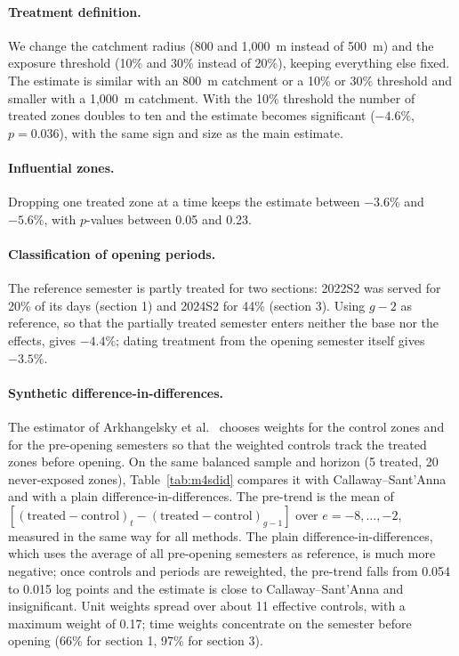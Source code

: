\paragraph{Treatment definition.} We change the catchment radius (800 and 1,000~m instead of 500~m) and the exposure threshold (10\% and 30\% instead of 20\%), keeping everything else fixed. The estimate is similar with an 800~m catchment or a 10\% or 30\% threshold and smaller with a 1,000~m catchment. With the 10\% threshold the number of treated zones doubles to ten and the estimate becomes significant ($-4.6\%$, $p=0.036$), with the same sign and size as the main estimate.

\paragraph{Influential zones.} Dropping one treated zone at a time keeps the estimate between $-3.6\%$ and $-5.6\%$, with $p$-values between 0.05 and 0.23.

\paragraph{Classification of opening periods.} The reference semester is partly treated for two sections: 2022S2 was served for 20\% of its days (section 1) and 2024S2 for 44\% (section 3). Using $g-2$ as reference, so that the partially treated semester enters neither the base nor the effects, gives $-4.4\%$; dating treatment from the opening semester itself gives $-3.5\%$.

\paragraph{Synthetic difference-in-differences.} The estimator of Arkhangelsky et al.\ \cite{arkhangelsky2021} chooses weights for the control zones and for the pre-opening semesters so that the weighted controls track the treated zones before opening. On the same balanced sample and horizon (5 treated, 20 never-exposed zones), Table~\ref{tab:m4sdid} compares it with Callaway--Sant'Anna and with a plain difference-in-differences. The pre-trend is the mean of $[(\text{treated}-\text{control})_t-(\text{treated}-\text{control})_{g-1}]$ over $e=-8,\dots,-2$, measured in the same way for all methods. The plain difference-in-differences, which uses the average of all pre-opening semesters as reference, is much more negative; once controls and periods are reweighted, the pre-trend falls from 0.054 to 0.015 log points and the estimate is close to Callaway--Sant'Anna and insignificant. Unit weights spread over about 11 effective controls, with a maximum weight of 0.17; time weights concentrate on the semester before opening (66\% for section 1, 97\% for section 3).

